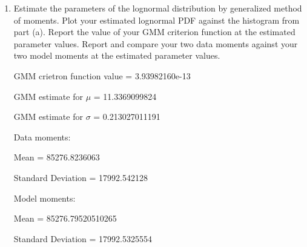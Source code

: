 \documentclass[letterpaper,12pt]{article}
\theoremstyle{definition}
\begin{document}
\begin{enumerate}
\begin{enumerate}
\item Estimate the parameters of the lognormal distribution by generalized method of moments. Plot your estimated lognormal PDF against the histogram from part (a). Report the value of your GMM criterion function at the estimated parameter values. Report and compare your two data moments against your two model moments at the estimated parameter values.
\par
\begin{figure}[H]\centering\captionsetup{width=4.0in}
\end{figure}
\par
GMM crietron function value = 3.93982160e-13\par
GMM estimate for $\mu$ = 11.3369099824 \par
GMM estimate for $\sigma$ = 0.213027011191\par
Data moments:\par
\hspace{2mm}Mean = 85276.8236063\par
\hspace{2mm}Standard Deviation = 17992.542128\par
Model moments:\par
\hspace{2mm}Mean = 85276.79520510265\par
\hspace{2mm}Standard Deviation = 17992.5325554\par
\bigskip


\end{enumerate}
\end{enumerate}
\end{document}
